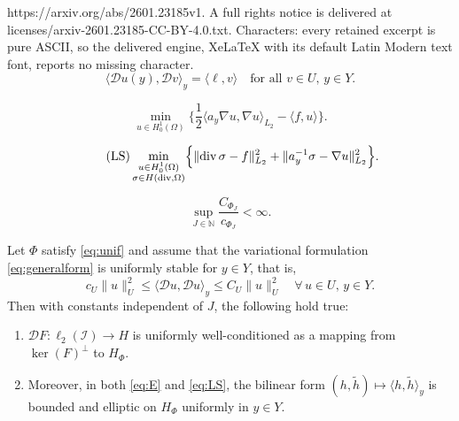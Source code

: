 \documentclass[10pt,a4paper]{amsart}
\DeclareMathOperator*{\Div}{div}
\newcommand{\N}{\mathbb{N}}
\providecommand{\norm}[1]{\lVert#1\rVert}
\begin{document}
https://arxiv.org/abs/2601.23185v1. A full rights notice is delivered at licenses/arxiv-2601.23185-CC-BY-4.0.txt. Characters: every retained excerpt is pure ASCII, so the delivered engine, XeLaTeX with its default Latin Modern text font, reports no missing character.
\begin{equation}\label{eq:generalform}
    \langle \mathcal D u(y), \mathcal D v \rangle_y = \langle \ell, v \rangle \quad \text{for all $v \in U$, $y \in Y$.} 
\end{equation}

\begin{equation}\tag{E}\label{eq:E}
   \min_{u \in H^1_0(\Omega) } \bigl\{  \textstyle\frac12 \displaystyle \langle a_y \nabla u, \nabla u \rangle_{L_2} - \langle f, u\rangle \bigr\}.
\end{equation}

\begin{equation}\tag{LS}\label{eq:LS}
  \min_{ \substack{ u \in H^1_0(\Omega)  \\ \sigma \in H(\Div,\Omega) }} \Bigl\{  \norm{ \Div \sigma - f }_{L_2}^2 + \norm{a_y^{-1} \sigma - \nabla u }_{L_2}^2 \Bigr\}.
\end{equation}

\begin{equation}\label{eq:unif}
  \sup_{J \in \N} \frac{C_{\Phi_J}}{c_{\Phi_J}} < \infty.
\end{equation}

\begin{prop}
\label{prop:stab}
Let $\Phi$ satisfy \eqref{eq:unif} and assume that the variational formulation \eqref{eq:generalform} is uniformly stable for $y\in Y$, that is,
 \[
 c_U\|u\|^2_{U}\leq \langle \mathcal Du,\mathcal Du\rangle_y	\leq C_U\|u\|^2_{U}\quad  \forall \,u\in U, \,y\in Y.
 \]
 Then with constants independent of $J$, the following hold true:
\begin{enumerate}[\rm(i)]
\item $\mathcal{D} F  \colon \ell_2(\mathcal{I}) \to  H$
 is uniformly well-conditioned as a mapping from $\ker ( F )^\bot$ to $H_\Phi$.
 \item Moreover, in both \eqref{eq:E} and \eqref{eq:LS}, the bilinear form $(h, \tilde h) \mapsto \langle h, \tilde h\rangle_y$ is bounded and elliptic on $H_\Phi$ uniformly in $y \in Y$.
\end{enumerate}
 \end{prop}
\end{document}
